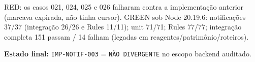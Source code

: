 RED: os casos 021, 024, 025 e 026 falharam contra a implementação anterior
(marcava expirada, não tinha cursor). GREEN sob Node 20.19.6: notificações
37/37 (integração 26/26 e Rules 11/11); unit 71/71; Rules 77/77; integração
completa 151 passam / 14 falham (legadas em reagentes/patrimônio/roteiros).

\textbf{Estado final:} \texttt{IMP-NOTIF-003} = \texttt{NÃO DIVERGENTE} no
escopo backend auditado.
